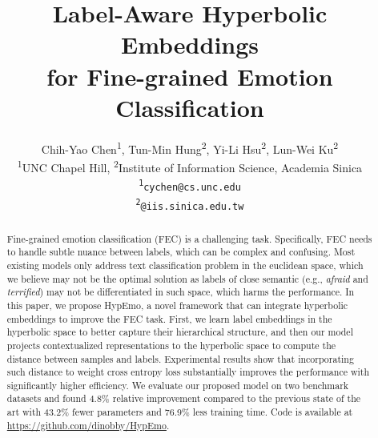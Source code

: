 \documentclass[11pt]{article}
\title{Label-Aware Hyperbolic Embeddings\\for Fine-grained Emotion Classification}
\author{Chih-Yao Chen\textsuperscript{1}, Tun-Min Hung\textsuperscript{2}, Yi-Li Hsu\textsuperscript{2}, Lun-Wei Ku\textsuperscript{2}\\
  \textsuperscript{1}UNC Chapel Hill, \textsuperscript{2}Institute of Information Science, Academia Sinica \\
\texttt{\textsuperscript{1}cychen@cs.unc.edu} \\
\texttt{\textsuperscript{2}{\string{allenhung,yili.hsu,lwku\string}}@iis.sinica.edu.tw} \\}
\newcommand{\modelname}[0]{HypEmo}
\begin{document}
\maketitle
\begin{abstract}
Fine-grained emotion classification (FEC) is a challenging task. Specifically, FEC needs to handle subtle nuance between labels, which can be complex and confusing. Most existing models only address text classification problem in the euclidean space, which we believe may not be the optimal solution as labels of close semantic (e.g., \textit{afraid} and \textit{terrified}) may not be differentiated in such space, which harms the performance. In this paper, we propose \modelname, a novel framework that can integrate hyperbolic embeddings to improve the FEC task. First, we learn label embeddings in the hyperbolic space to better capture their hierarchical structure, and then our model projects contextualized representations to the hyperbolic space to compute the distance between samples and labels. Experimental results show that incorporating such distance to weight cross entropy loss substantially improves the performance with significantly higher efficiency. We evaluate our proposed model on two benchmark datasets and found 4.8\% relative improvement compared to the previous state of the art with 43.2\% fewer parameters and 76.9\% less training time. Code is available at \url{https://github.com/dinobby/HypEmo}.

\end{abstract}











\appendix


\end{document}
